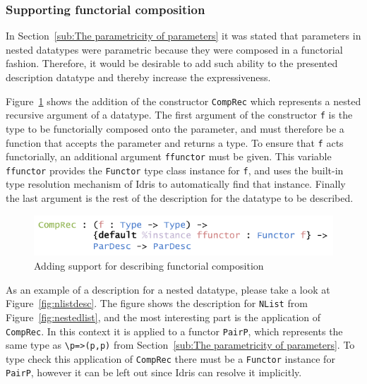 \documentclass{ituthesis}
\newcommand{\ttconstructor}[1]{\textcolor{constructor-color}{\texttt{#1}}}
\newcommand{\tttype}[1]{\textcolor{type-color}{\texttt{#1}}}
\newcommand{\ttdec}[1]{\textcolor{declared-var-color}{\texttt{#1}}}
\newcommand{\ttvar}[1]{\textcolor{local-var-color}{\texttt{#1}}}
\theoremstyle{break}
\begin{document}
\subsubsection{Supporting functorial composition}
\label{ssub:Supporting functorial composition}
In Section~\ref{sub:The parametricity of parameters} it was stated that parameters in nested datatypes were parametric because they were composed in a functorial fashion.
Therefore, it would be desirable to add such ability to the presented description datatype and thereby increase the expressiveness.

Figure~\ref{fig:pardescex} shows the addition of the constructor \ttconstructor{CompRec} which represents a nested recursive argument of a datatype.
The first argument of the constructor \ttvar{f} is the type to be functorially composed onto the parameter, and must therefore be a function that accepts the parameter
and returns a type.
To ensure that \ttvar{f} acts functorially, an additional argument \ttvar{ffunctor} must be given.
This variable \ttvar{ffunctor} provides the \tttype{Functor} type class instance for \ttvar{f}, and uses the built-in type resolution mechanism of Idris to automatically find that instance.
Finally the last argument is the rest of the description for the datatype to be described.

\begin{figure}[ht]
\begin{center}
    \includegraphics[scale=0.5]{Figures/ParDescriptionTypeExtended.png}
\end{center}
\caption{Adding support for describing functorial composition}
\label{fig:pardescex}
\end{figure}

As an example of a description for a nested datatype, please take a look at Figure~\ref{fig:nlistdesc}.
The figure shows the description for \tttype{NList} from Figure~\ref{fig:nestedlist}, and the most interesting
part is the application of \ttconstructor{CompRec}.
In this context it is applied to a functor \ttdec{PairP}, which represents the same type as \texttt{\textbackslash}\ttvar{p}\texttt{=>}\tttype{(}\ttvar{p}\tttype{,}\ttvar{p}\tttype{)} from Section~\ref{sub:The parametricity of parameters}.
To type check this application of \ttconstructor{CompRec} there must be a \tttype{Functor} instance for \ttdec{PairP}, however it can be left out since Idris can resolve it implicitly.
\end{document}
